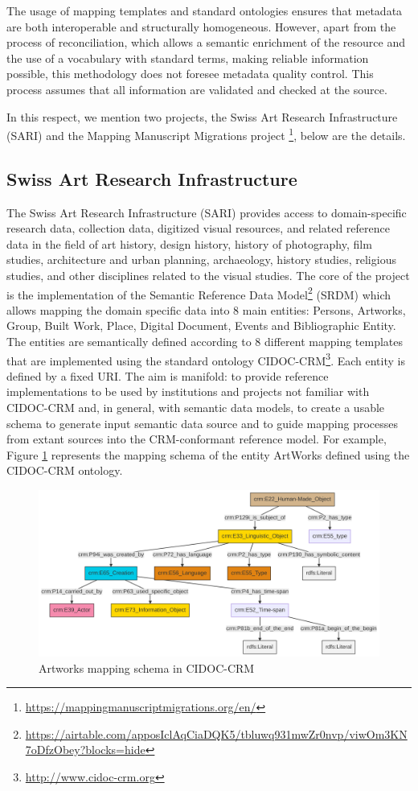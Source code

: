 \documentclass[epsfig,a4paper,12pt,titlepage]{book}
\begin{document}
The usage of mapping templates and standard ontologies ensures that metadata are both interoperable and structurally homogeneous. However, apart from the process of reconciliation, which allows a semantic enrichment of the resource and the use of a vocabulary with standard terms, making reliable information possible, this methodology does not foresee  metadata quality control. This process assumes that all information are validated and checked at the source.

In this respect, we mention two projects, the Swiss Art Research Infrastructure (SARI) and the Mapping Manuscript Migrations project \footnote{\url{https://mappingmanuscriptmigrations.org/en/}}, below are the details.

\subsection{Swiss Art Research Infrastructure}
\label{sec:sari}
The Swiss Art Research Infrastructure (SARI) provides access to domain-specific research data, collection data, digitized visual resources, and related reference data in the field of art history, design history, history of photography, film studies, architecture and urban planning, archaeology, history studies, religious studies, and other disciplines related to the visual studies. The core of the project is the implementation of the Semantic Reference Data Model\footnote{\url{https://airtable.com/apposIclAqCiaDQK5/tbluwq931mwZr0nvp/viwOm3KN7oDfzObey?blocks=hide}} (SRDM) which allows mapping the domain specific data into 8 main entities: Persons, Artworks, Group, Built Work, Place, Digital Document, Events and Bibliographic Entity. The entities are semantically defined according to 8 different mapping templates that are implemented using the standard ontology CIDOC-CRM\footnote{\url{http://www.cidoc-crm.org}}\cite{doerr:DSP:2005:35}. Each entity is defined by a fixed URI. The aim is manifold: to provide reference implementations to be used by institutions and projects not familiar with CIDOC-CRM and, in general, with semantic data models, to create a usable schema to generate input semantic data source and to guide mapping processes from extant sources into the CRM-conformant reference model. For example, Figure \ref{e22} represents the mapping schema of the entity ArtWorks defined using the CIDOC-CRM ontology. 

\begin{figure}[H]
\includegraphics[width=16cm]{e22.png}
\caption{Artworks mapping schema in CIDOC-CRM}
\label{e22}
\end{figure}
\end{document}
